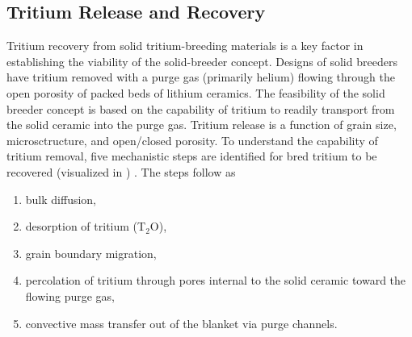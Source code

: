 \documentclass[11pt]{report} %
\begin{document}


\subsection{Tritium Release and Recovery}
Tritium recovery from solid tritium-breeding materials is a key factor in establishing the viability of the solid-breeder concept. Designs of solid breeders have tritium removed with a purge gas (primarily helium) flowing through the open porosity of packed beds of lithium ceramics. The feasibility of the solid breeder concept is based on the capability of tritium to readily transport from the solid ceramic into the purge gas. Tritium release is a function of grain size, microsctructure, and open/closed porosity. To understand the capability of tritium removal, five mechanistic steps are identified for bred tritium to be recovered (visualized in ) . The steps follow as
\begin{enumerate}
\item bulk diffusion,
\item desorption of tritium (T$_2$O),
\item grain boundary migration,
\item percolation of tritium through pores internal to the solid ceramic toward the flowing purge gas,
\item convective mass transfer out of the blanket via purge channels.
\end{enumerate}
\end{document}
